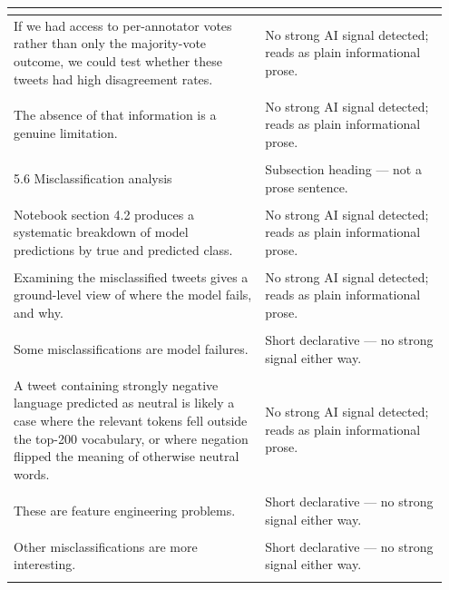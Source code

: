 \documentclass[11pt]{article}
\begin{document}
\begin{longtable}{|p{0.55\linewidth}|p{0.40\linewidth}|}
{\begin{itemize}[leftmargin=*,topsep=2pt,itemsep=1pt,parsep=0pt]
\end{itemize}}\vspace{2em} & \\
\hline
If we had access to per-annotator votes rather than only the majority-vote outcome, we could test whether these tweets had high disagreement rates. & No strong AI signal detected; reads as plain informational prose. \\[2pt]
\hline
\rule{0pt}{3.5cm} & \\
\hline
The absence of that information is a genuine limitation. & No strong AI signal detected; reads as plain informational prose. \\[2pt]
\hline
\rule{0pt}{3.5cm} & \\
\hline
5.6 Misclassification analysis & Subsection heading --- not a prose sentence. \\[2pt]
\hline
\rule{0pt}{3.5cm} & \\
\hline
Notebook section 4.2 produces a systematic breakdown of model predictions by true and predicted class. & No strong AI signal detected; reads as plain informational prose. \\[2pt]
\hline
\rule{0pt}{3.5cm} & \\
\hline
Examining the misclassified tweets gives a ground-level view of where the model fails, and why. & No strong AI signal detected; reads as plain informational prose. \\[2pt]
\hline
\rule{0pt}{3.5cm} & \\
\hline
Some misclassifications are model failures. & Short declarative --- no strong signal either way. \\[2pt]
\hline
\rule{0pt}{3.5cm} & \\
\hline
A tweet containing strongly negative language predicted as neutral is likely a case where the relevant tokens fell outside the top-200 vocabulary, or where negation flipped the meaning of otherwise neutral words. & No strong AI signal detected; reads as plain informational prose. \\[2pt]
\hline
\rule{0pt}{3.5cm} & \\
\hline
These are feature engineering problems. & Short declarative --- no strong signal either way. \\[2pt]
\hline
\rule{0pt}{3.5cm} & \\
\hline
Other misclassifications are more interesting. & Short declarative --- no strong signal either way. \\[2pt]
\hline
\rule{0pt}{3.5cm} & \\

\end{longtable}
\end{document}
